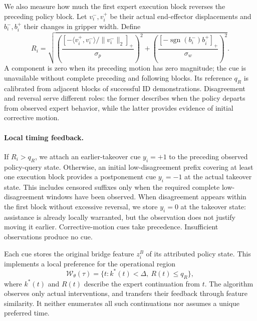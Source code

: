 We also measure how much the first expert execution block reverses the
preceding policy block. Let $v_i^-,v_i^+$ be their actual end-effector
displacements and $b_i^-,b_i^+$ their changes in gripper width. Define
\begin{equation}
R_i=\sqrt{
 \left(\frac{[-\langle v_i^+,v_i^-\rangle/\|v_i^-\|_2]_+}{\sigma_p}\right)^2
 +\left(\frac{[-\operatorname{sgn}(b_i^-)b_i^+]_+}{\sigma_w}\right)^2}.
\label{eq:ef_reversal}
\end{equation}
A component is zero when its preceding motion has zero magnitude; the cue
is unavailable without complete preceding and following blocks. Its reference
$q_R$ is calibrated from adjacent blocks of successful ID demonstrations.
Disagreement and reversal serve different roles: the former describes when
the policy departs from observed expert behavior, while the latter provides
evidence of initial corrective motion.

\paragraph{Local timing feedback.}
If $R_i>q_R$, we attach an earlier-takeover cue $y_i=+1$ to the preceding
observed policy-query state. Otherwise, an initial low-disagreement prefix
covering at least one execution block provides a postponement cue $y_i=-1$
at the actual takeover state. This includes censored suffixes only when
the required complete low-disagreement windows have been observed. When
disagreement appears within the first block without excessive reversal, we
store $y_i=0$ at the takeover state: assistance is already locally warranted,
but the observation does not justify moving it earlier. Corrective-motion
cues take precedence. Insufficient observations produce no cue.

Each cue stores the original bridge feature $z_i^B$ of its attributed policy
state. This implements a local preference for the operational region
\begin{equation}
\mathcal W_\theta(\tau)
=\{t:k^*(t)<\Delta,\ R(t)\le q_R\},
\label{eq:ef_preferred_region}
\end{equation}
where $k^*(t)$ and $R(t)$ describe the expert continuation from $t$.
The algorithm observes only actual interventions, and transfers their
feedback through feature similarity. It neither enumerates all such
continuations nor assumes a unique preferred time.

